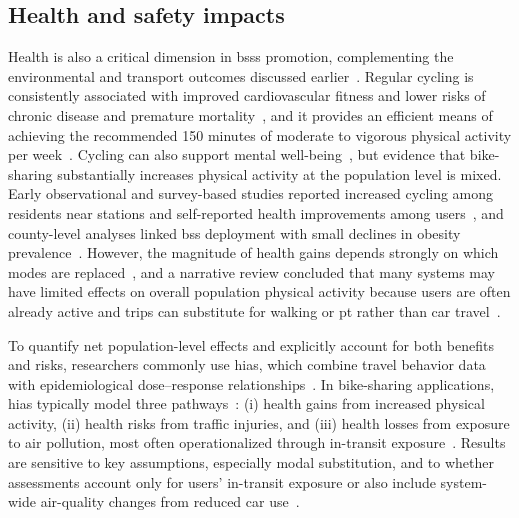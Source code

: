 \subsection{Health and safety impacts}

Health is also a critical dimension in \acp{bss} promotion, complementing the environmental and transport outcomes discussed earlier~\cite{DeMaio2009, Fishman2016, Qiu2018}. Regular cycling is consistently associated with improved cardiovascular fitness and lower risks of chronic disease and premature mortality~\cite{Green2021, Celis-Morales2017, Dutheil2020}, and it provides an efficient means of achieving the recommended 150 minutes of moderate to vigorous physical activity per week~\cite{Knowler2002}. Cycling can also support mental well-being~\cite{Chekroud2018, Ruiz2015}, but evidence that bike-sharing substantially increases physical activity at the population level is mixed. Early observational and survey-based studies reported increased cycling among residents near stations and self-reported health improvements among users~\cite{Fuller2013, Molina-Garcia2013, Alberts2012}, and county-level analyses linked \ac{bss} deployment with small declines in obesity prevalence~\cite{Xu2019, Hosford2019}. However, the magnitude of health gains depends strongly on which modes are replaced~\cite{Fishman2014, Murphy2015}, and a narrative review concluded that many systems may have limited effects on overall population physical activity because users are often already active and trips can substitute for walking or \ac{pt} rather than car travel~\cite{Bauman2017}.

To quantify net population-level effects and explicitly account for both benefits and risks, researchers commonly use \acp{hia}, which combine travel behavior data with epidemiological dose--response relationships~\cite{Rojas-Rueda2011, Woodcock2014, Otero2018, Clockston2021}. In bike-sharing applications, \acp{hia} typically model three pathways~\cite{Teixeira2021}: (i) health gains from increased physical activity, (ii) health risks from traffic injuries, and (iii) health losses from exposure to air pollution, most often operationalized through in-transit  exposure~\cite{Woodcock2014, Otero2018, Clockston2021, Cao2021}. Results are sensitive to key assumptions, especially modal substitution, and to whether assessments account only for users' in-transit exposure or also include system-wide air-quality changes from reduced car use~\cite{Clockston2021, Hou2023}.

